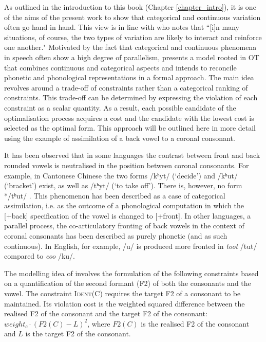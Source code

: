 As outlined in the introduction to this book (Chapter \ref{chapter_intro}), it is one of the aims of the present work to show that categorical and continuous variation often go hand in hand. This view is in line with \citet[88]{Ladd2014} who notes that ``[i]n many situations, of course, the two types of variation are likely to interact and reinforce one another." Motivated by the fact that categorical and continuous phenomena in speech often show a high degree of parallelism, \citet{Flemming2001} presents a model rooted in OT that combines continuous and categorical aspects and intends to reconcile phonetic and phonological representations in a formal approach. The main idea revolves around a trade-off of constraints rather than a categorical ranking of constraints. This trade-off can be determined by expressing the violation of each constraint as a scalar quantity. As a result, each possible candidate of the optimalisation process acquires a cost and the candidate with the lowest cost is selected as the optimal form. This approach will be outlined here in more detail using the example of assimilation of a back vowel to a coronal consonant.

It has been observed that in some languages the contrast between front and back rounded vowels is neutralised in the position between coronal consonants. For example, in Cantonese Chinese the two forms /kʰyt/ (`decide') and /kʰut/ (`bracket') exist, as well as /tʰyt/ (`to take off'). There is, however, no form */tʰut/ \citep{Flemming2001}. This phenomenon has been described as a case of categorical assimilation, i.e. as the outcome of a phonological computation in which the  [+back] specification of the vowel is changed to [+front]. In other languages, a parallel process, the co-articulatory fronting of back vowels in the context of coronal consonants has been described as purely phonetic (and as such continuous). In English, for example, /u/ is produced more fronted in \emph{toot} /tut/ compared to \emph{coo} /ku/. 

The modelling idea of \citet{Flemming2001} involves the formulation of the following constraints based on a quantification of the second formant (F2) of both the consonants and the vowel. The constraint \textsc{Ident(C)} requires the target F2 of a consonant to be maintained. Its violation cost is the weighted squared difference between the realised F2 of the consonant and the target F2 of the consonant: $weight_c \cdot (F2(C) - L)^2$, where $F2(C)$ is the realised F2 of the consonant and $L$ is the target F2 of the consonant.

